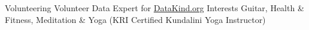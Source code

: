 \begin{additionals}
  \addional
    {Volunteering}
    {Volunteer Data Expert for \href{https://www.datakind.org/datacorps}{DataKind.org}}
  \addional
    {Interests}{ Guitar, Health \& Fitness, Meditation \& Yoga (KRI Certified Kundalini Yoga Instructor)}
\end{additionals}